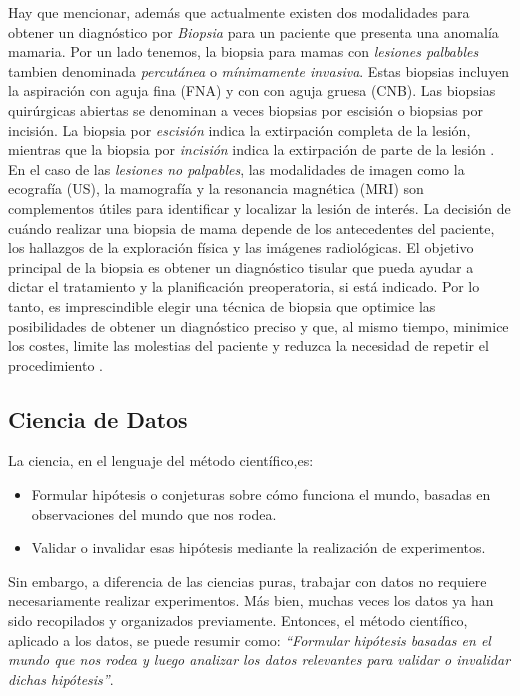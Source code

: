 Hay que mencionar, además que actualmente existen dos modalidades para obtener un diagnóstico por \textit{Biopsia} para un paciente que presenta una anomalía mamaria. Por un lado tenemos, la biopsia para mamas con \textit{lesiones palbables} tambien denominada \textit{percutánea} o \textit{mínimamente invasiva}. Estas biopsias incluyen la aspiración con aguja fina (FNA) y con con aguja gruesa (CNB). Las biopsias quirúrgicas abiertas se denominan a veces biopsias por escisión o biopsias por incisión. La biopsia por \textit {escisión} indica la extirpación completa de la lesión, mientras que la biopsia por \textit {incisión} indica la extirpación de parte de la lesión \cite{Greenfield2012}. En el caso de las \textit{lesiones no palpables}, las modalidades de imagen como la ecografía (US), la mamografía y la resonancia magnética (MRI) son complementos útiles para identificar y localizar la lesión de interés. La decisión de cuándo realizar una biopsia de mama depende de los antecedentes del paciente, los hallazgos de la exploración física y las imágenes radiológicas. El objetivo principal de la biopsia es obtener un diagnóstico tisular que pueda ayudar a dictar el tratamiento y la planificación preoperatoria, si está indicado. Por lo tanto, es imprescindible elegir una técnica de biopsia que optimice las posibilidades de obtener un diagnóstico preciso y que, al mismo tiempo, minimice los costes, limite las molestias del paciente y reduzca la necesidad de repetir el procedimiento \cite{Samilia2018}.

\newpage
\subsection{Ciencia de Datos}
La ciencia, en el lenguaje del método científico,es:
\begin{itemize}
	\item Formular hipótesis o conjeturas sobre cómo funciona el mundo, basadas en observaciones del mundo que nos rodea.
	\item Validar o invalidar esas hipótesis mediante la realización de experimentos.
\end{itemize}                   
Sin embargo, a diferencia de las ciencias puras, trabajar con datos no requiere necesariamente realizar experimentos. Más bien, muchas veces los datos ya han sido recopilados y organizados previamente. Entonces, el método científico, aplicado a los datos, se puede resumir como: \textit{“Formular hipótesis basadas en el mundo que nos rodea y luego analizar los datos relevantes para validar o invalidar dichas hipótesis”}. 

